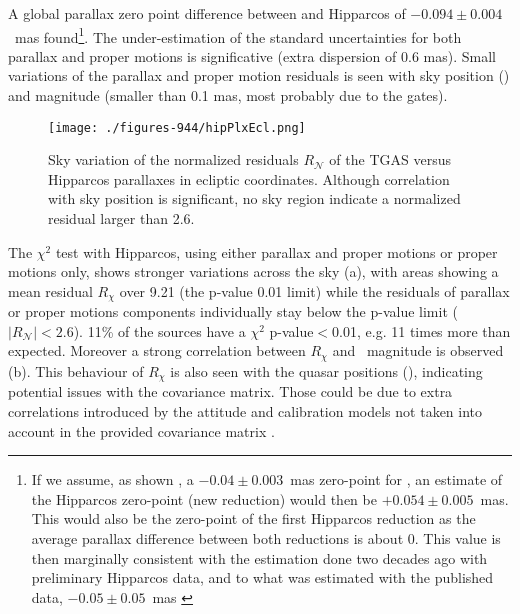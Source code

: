 A global parallax zero point difference between {\gaia} and Hipparcos of $-0.094\pm 0.004$~mas  found\footnote{If we 
assume, as shown , a $-0.04\pm 0.003$~mas zero-point for {}, 
an estimate of the Hipparcos zero-point (new reduction) would then be $+0.054\pm 0.005$~mas. This
would also be the zero-point of the first Hipparcos reduction as the average parallax difference between both reductions
is about 0. This value is then marginally consistent with the estimation done two decades ago 
\cite[$-0.02\pm 0.06$~mas,][]{1995A&A...304...52A} with preliminary Hipparcos data, and to what was estimated with the published data, $-0.05\pm 0.05$~mas \cite[][Vol III, Chap. 20.]{1997ESASP1200.....E}}.
The under-estimation of the standard uncertainties for both parallax and proper motions  is significative (extra dispersion of 0.6 mas). Small variations of the parallax and proper motion residuals is seen with sky position  () and magnitude (smaller than 0.1 mas, most probably due to the gates).

\begin{figure}
    \begin{center}
        \texttt{[image: ./figures-944/hipPlxEcl.png]}
        \caption[TGAS versus Hipparcos Parallaxes]{Sky variation of the normalized residuals $R_\mathcal{N}$ of the TGAS versus Hipparcos parallaxes in ecliptic coordinates. Although correlation with sky position is significant, no sky region indicate a normalized residual larger than 2.6.}
        \label{fig:cu9val_wp944_hipplx} 
    \end{center}
\end{figure}

The $\chi^2$ test with Hipparcos, using either parallax and proper motions or proper motions only, shows stronger variations across the sky (a), with areas showing a mean residual $R_\chi$ over 9.21 (the p-value 0.01 limit)  while the residuals of parallax or proper motions components individually stay below the p-value limit ($\vert R_\mathcal{N} \vert<2.6$). 11\% of the sources have a $\chi^2$ p-value$<$0.01, e.g. 11 times more than expected.
Moreover a strong correlation between $R_\chi$ and \gmag~magnitude is observed  (b). This behaviour of $R_\chi$ is also seen with the quasar positions (), indicating potential issues with the covariance matrix. Those could be due to extra correlations introduced by the attitude and calibration models not taken into account in the provided covariance matrix \citep{2012A&A...543A..14H}.

